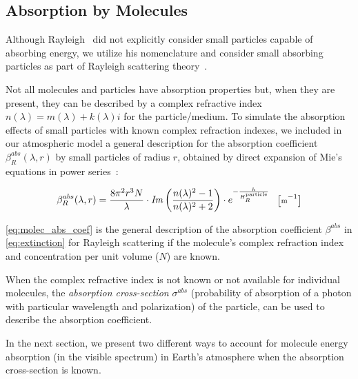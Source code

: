 \documentclass[journal]{vgtc}                %
\newcommand{\anderscomment}[1]{\textbf{[AY~} \textcolor{cyan}{#1} \textbf{~]}}
\begin{document}
\subsection{Absorption by Molecules}

Although 
Rayleigh~\cite{Rayleigh:1871} did not explicitly consider small particles capable of absorbing energy, we utilize his nomenclature and consider small absorbing particles as part of Rayleigh scattering theory~\cite{Kerker:1978, Bohren:1983, Mishchenko:2006}.

Not all molecules and particles have absorption properties but, when they are present, they can be described by a complex refractive index $n(\lambda) = m(\lambda) + k(\lambda) i$ for the particle/medium. To simulate the absorption effects of small particles with known complex refraction indexes, we included in our atmospheric model a general description for the absorption coefficient $\beta_{R}^{abs}(\lambda, r)$ by small particles of radius $r$, obtained by direct expansion of Mie's equations in power series~\cite{Bohren:1983, Petty:2006}:

\vspace*{-3mm}
\begin{equation}\label{eq:molec_abs_coef}
\small
\beta_{R}^{abs}(\lambda, r) = \frac{8\pi^2 r^3 N}{\lambda}\cdot \mathit{Im}\left(\frac{n(\lambda)^2 - 1}{n(\lambda)^2 + 2}\right) \cdot e^{-\frac{h}{H_R^{\text{particle}}}} \quad \big[\text{m}^{-1}\big]
\end{equation}
\vspace*{-3mm}

\autoref{eq:molec_abs_coef} is the general description of the absorption coefficient $\beta^{abs}$ in \autoref{eq:extinction} for Rayleigh scattering if the molecule's complex refraction index and concentration per unit volume ($N$) are known.

When the complex refractive index is not known or not available for individual molecules, the \textit{absorption cross-section} $\sigma^{abs}$ (probability of absorption of a photon with particular wavelength and polarization) of the particle, can be used to describe the absorption coefficient.

In the next section, we present two different ways to account for molecule energy absorption (in the visible spectrum) in Earth's atmosphere when the absorption cross-section is known.
\end{document}
